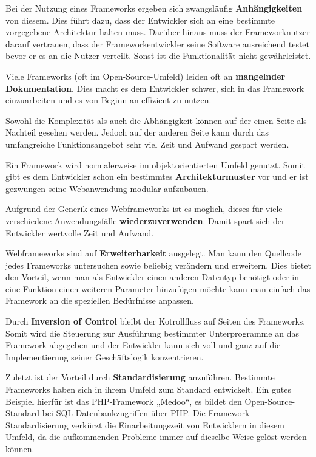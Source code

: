 Bei der Nutzung eines Frameworks ergeben sich zwangsläufig \textbf{Anhängigkeiten} von diesem. Dies führt dazu, dass der Entwickler sich an eine bestimmte vorgegebene Architektur halten muss. Darüber hinaus muss der Frameworknutzer darauf vertrauen, dass der Frameworkentwickler seine Software ausreichend testet bevor er es an die Nutzer verteilt. Sonst ist die Funktionalität nicht gewährleistet.

Viele Frameworks (oft im Open-Source-Umfeld) leiden oft an \textbf{mangelnder Dokumentation}. Dies macht es dem Entwickler schwer, sich in das Framework einzuarbeiten und es von Beginn an effizient zu nutzen.

Sowohl die Komplexität als auch die Abhängigkeit können auf der einen Seite als Nachteil gesehen werden. Jedoch auf der anderen Seite kann durch das umfangreiche Funktionsangebot sehr viel Zeit und Aufwand gespart werden.

Ein Framework wird normalerweise im objektorientierten Umfeld genutzt. Somit gibt es dem Entwickler schon ein bestimmtes \textbf{Architekturmuster} vor und er ist gezwungen seine Webanwendung modular aufzubauen.

Aufgrund der Generik eines Webframeworks ist es möglich, dieses für viele verschiedene Anwendungsfälle \textbf{wiederzuverwenden}. Damit spart sich der Entwickler wertvolle Zeit und Aufwand.

Webframeworks sind auf \textbf{Erweiterbarkeit} ausgelegt. Man kann den Quellcode jedes Frameworks untersuchen sowie beliebig verändern und erweitern. Dies bietet den Vorteil, wenn man als Entwickler einen anderen Datentyp benötigt oder in eine Funktion einen weiteren Parameter hinzufügen möchte kann man einfach das Framework an die speziellen Bedürfnisse anpassen.

Durch \textbf{Inversion of Control} bleibt der Kotrollfluss auf Seiten des Frameworks. Somit wird die Steuerung zur Ausführung bestimmter Unterprogramme an das Framework abgegeben und der Entwickler kann sich voll und ganz auf die Implementierung seiner Geschäftslogik konzentrieren.

Zuletzt ist der Vorteil durch \textbf{Standardisierung} anzuführen. Bestimmte Frameworks haben sich in ihrem Umfeld zum Standard entwickelt. Ein gutes Beispiel hierfür ist das PHP-Framework „Medoo“, es bildet den Open-Source-Standard bei SQL-Datenbankzugriffen über PHP. Die Framework Standardisierung verkürzt die Einarbeitungszeit von Entwicklern in diesem Umfeld, da die aufkommenden Probleme immer auf dieselbe Weise gelöst werden können.\autocites[vgl.][313\psqq]{Schatten2010}

